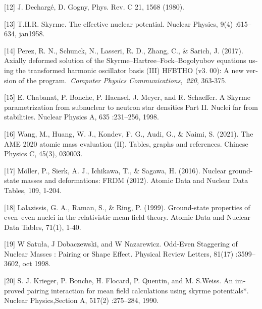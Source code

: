 \documentclass[a4paper]{article}
\begin{document}
\textenglish{ [12] J. Dechargé, D. Gogny, Phys. Rev. C 21, 1568 (1980). }

\textenglish{[13] T.H.R. Skyrme. The effective nuclear potential. Nuclear Physics, 9(4) :615–634, jan1958.}

\textenglish{\textcolor[rgb]{0.13333334,0.13333334,0.13333334}{[14] Perez, R. N., Schunck, N., Lasseri, R. D., Zhang, C., \& Sarich, J. (2017). Axially deformed solution of the Skyrme–Hartree–Fock–Bogolyubov equations using the transformed harmonic oscillator basis (III) HFBTHO (v3. 00): A new version of the program.~}}\textenglish{\textit{\textcolor[rgb]{0.13333334,0.13333334,0.13333334}{Computer Physics Communications}}}\textenglish{\textcolor[rgb]{0.13333334,0.13333334,0.13333334}{,~}}\textenglish{\textit{\textcolor[rgb]{0.13333334,0.13333334,0.13333334}{220}}}\textenglish{\textcolor[rgb]{0.13333334,0.13333334,0.13333334}{, 363-375.}}

\textenglish{\textcolor[rgb]{0.13333334,0.13333334,0.13333334}{[15] E. Chabanat, P. Bonche, P. Haensel, J. Meyer, and R. Schaeffer. A Skyrme parametrization from subnuclear to neutron star densities Part II. Nuclei far from stabilities. Nuclear Physics A, 635 :231–256, 1998.}}

\textenglish{[16] Wang, M., Huang, W. J., Kondev, F. G., Audi, G., \& Naimi, S. (2021). The AME 2020 atomic mass evaluation (II). Tables, graphs and references. Chinese Physics C, 45(3), 030003.}

\textenglish{[17] Möller, P., Sierk, A. J., Ichikawa, T., \& Sagawa, H. (2016). Nuclear ground-state masses and deformations: FRDM (2012). Atomic Data and Nuclear Data Tables, 109, 1-204.}

\textenglish{[18] Lalazissis, G. A., Raman, S., \& Ring, P. (1999). Ground-state properties of even–even nuclei in the relativistic mean-field theory. Atomic Data and Nuclear Data Tables, 71(1), 1-40.}

\textenglish{[19] W Satuła, J Dobaczewski, and W Nazarewicz. Odd-Even Staggering of Nuclear Masses : Pairing or Shape Effect. Physical Review Letters, 81(17) :3599–3602, oct 1998.}

\textenglish{[20] S. J. Krieger, P. Bonche, H. Flocard, P. Quentin, and M. S.Weiss. An improved pairing interaction for mean field calculations using skyrme potentials*. Nuclear Physics,Section A, 517(2) :275–284, 1990.}
\end{document}
